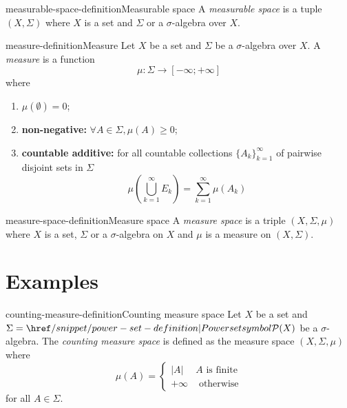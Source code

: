 \documentclass[preview]{standalone}
\begin{document}
\genpage

\begin{snippetdefinition}{measurable-space-definition}{Measurable space}
    A \textit{measurable space} is a tuple \((X, \Sigma)\)
    where \(X\) is a set and \(\Sigma\) or a \(\sigma\)-algebra over \(X\).
\end{snippetdefinition}

\begin{snippetdefinition}{measure-definition}{Measure}
    Let \(X\) be a set and \(\Sigma\) be a \(\sigma\)-algebra over \(X\).
    A \textit{measure} is a function
    \[
        \mu\colon \Sigma \to [-\infty; + \infty]
    \]
    where
    \begin{enumerate}
        \item \(\mu(\emptyset) = 0\);
        \item \textbf{non-negative:} \(\forall A \in \Sigma, \mu(A) \geq 0\);
        \item \textbf{countable additive:} for all countable collections \({\{A_k\}}_{k=1}^\infty\)
        of pairwise disjoint sets in \(\Sigma\)
        \[
            \mu\left( \bigcup_{k=1}^\infty E_k \right)
            =
            \sum_{k=1}^\infty \mu(A_k)
        \]
    \end{enumerate}
\end{snippetdefinition}

\begin{snippetdefinition}{measure-space-definition}{Measure space}
    A \textit{measure space} is a triple \((X, \Sigma, \mu)\)
    where \(X\) is a set, \(\Sigma\) or a \(\sigma\)-algebra on \(X\)
    and \(\mu\) is a measure on \((X, \Sigma)\).
\end{snippetdefinition}

\section{Examples}

\begin{snippetdefinition}{counting-measure-definition}{Counting measure space}
    Let \(X\) be a set and \(\Sigma = \powerset(X)\) be a \(\sigma\)-algebra.
    The \textit{counting measure space}
    is defined as the measure space \((X, \Sigma, \mu)\)
    where
    \[
        \mu(A) = \begin{cases}
            |A| & A \text{ is finite} \\
            +\infty & \text{ otherwise}
        \end{cases}
    \]
    for all \(A \in \Sigma\).
\end{snippetdefinition}

\end{document}
